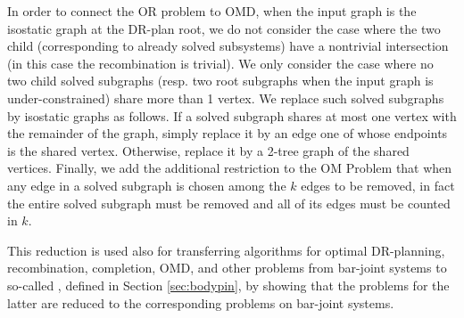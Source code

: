 In order to connect the OR problem to OMD, when the input graph is
the isostatic graph at the DR-plan root, we do not consider the case
where the two child  (corresponding to already
solved subsystems) have a nontrivial intersection (in this case the
recombination is trivial). We only consider the case where no two
child solved subgraphs (resp. two root subgraphs when the input graph
is under-constrained) share more than 1 vertex. We replace such solved
subgraphs  by isostatic graphs as follows. If a solved subgraph shares
at most one vertex with the remainder of the graph, simply replace it
by an edge one of whose endpoints  is the shared vertex. Otherwise,
replace it by  a 2-tree graph of the shared vertices. Finally, we add
the additional restriction to the OM Problem that when any edge in a
solved subgraph is chosen among the $k$ edges to be removed, in fact
the entire solved subgraph must be removed  and all of its edges must
be counted in $k$.

This reduction is used also for transferring  algorithms for optimal
DR-planning, recombination, completion, OMD, and other problems
from bar-joint systems to
so-called , defined in Section \ref{sec:bodypin},
by showing that the problems for the latter are reduced
to the corresponding problems on bar-joint systems.

